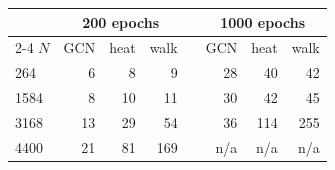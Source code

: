 \begin{tabular}{@{}lrrrcrrr@{}}
\toprule
& \multicolumn{3}{c}{200 epochs} & & \multicolumn{3}{c}{1000 epochs} \\
\cmidrule{2-4}\cmidrule{6-8}
$N$ & GCN & heat & walk & & GCN & heat & walk \\
\midrule
264 & 6 & 8 & 9 & & 28 & 40 & 42 \\
1584 & 8 & 10 & 11 & & 30 & 42 & 45 \\
3168 & 13 & 29 & 54 & & 36 & 114 & 255 \\
4400 & 21 & 81 & 169 & & n/a & n/a & n/a \\
\bottomrule
\end{tabular}
